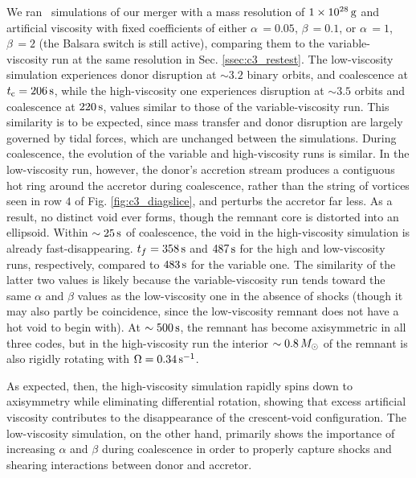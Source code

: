 We ran \gasoline\ simulations of our merger with a mass resolution of $1\times10^{28}\,\mathrm{g}$ and artificial viscosity with fixed coefficients of either $\alpha\,=0.05$, $\beta\,=0.1$, or $\alpha\,=1$, $\beta\,=2$ (the Balsara switch is still active), comparing them to the variable-viscosity run at the same resolution in Sec. \ref{ssec:c3_restest}.  The low-viscosity simulation experiences donor disruption at $\sim3.2$ binary orbits, and coalescence at $\tcoal = 206\,\mrm{s}$, while the high-viscosity one experiences disruption at $\sim3.5$ orbits and coalescence at $220\,\mathrm{s}$, values similar to those of the variable-viscosity run.  This similarity is to be expected, since mass transfer and donor disruption are largely governed by tidal forces, which are unchanged between the simulations.  During coalescence, the evolution of the variable and high-viscosity runs is similar.  In the low-viscosity run, however, the donor's accretion stream produces a contiguous hot ring around the accretor during coalescence, rather than the string of vortices seen in row $4$ of Fig. \ref{fig:c3_diagslice}, and perturbs the accretor far less.  As a result, no distinct void ever forms, though the remnant core is distorted into an ellipsoid.  Within $\sim25\,\mathrm{s}$ of coalescence, the void in the high-viscosity simulation is already fast-disappearing.  $t_f = 358\,\mathrm{s}$ and $487\,\mathrm{s}$ for the high and low-viscosity runs, respectively, compared to $483\,\mathrm{s}$ for the variable one.  The similarity of the latter two values is likely because the variable-viscosity run tends toward the same $\alpha$ and $\beta$ values as the low-viscosity one in the absence of shocks (though it may also partly be coincidence, since the low-viscosity remnant does not have a hot void to begin with).  At $\sim500\,\mathrm{s}$, the remnant has become axisymmetric in all three codes, but in the high-viscosity run the interior $\sim0.8\,\Msun$ of the remnant is also rigidly rotating with $\Omega = 0.34\,\mathrm{s}^{-1}$.


As expected, then, the high-viscosity simulation rapidly spins down to axisymmetry while eliminating differential rotation, showing that excess artificial viscosity contributes to the disappearance of the crescent-void configuration.  The low-viscosity simulation, on the other hand, primarily shows the importance of increasing $\alpha$ and $\beta$ during coalescence in order to properly capture shocks and shearing interactions between donor and accretor.

